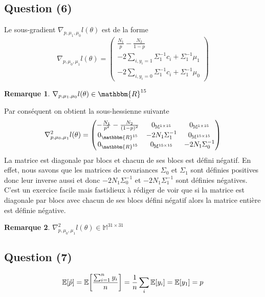 \documentclass[10pt,a4paper]{report}\usepackage[]{graphicx}\usepackage[]{color}
\newtheorem*{rmq}{Remarque}
\begin{document}
\subsection{Question (6)}

\noindent Le sous-gradient $\nabla_{p,\mu_1,\mu_0}l(\theta)$ est de la forme 
$$
\nabla_{p,\mu_0,\mu_1}l(\theta) = 
\begin{pmatrix} 
\frac{N_1}{p} - \frac{N_2}{1-p} \\
-2\sum_{i,y_i = 1}\Sigma_1^{-1} c_i + \Sigma_1^{-1}\mu_1 \\
-2\sum_{i,y_i = 0}\Sigma_1^{-1} c_i + \Sigma_1^{-1}\mu_0
\end{pmatrix}
$$

\begin{rmq}
\(\nabla_{p,\mu_1,\mu_0}l(\theta) \in \mathbbm{R}^{15}\)
\end{rmq}

Par cons\'equent on obtient la sous-hessienne suivante
$$
\nabla_{p,\mu_0,\mu_1}^2l(\theta) = 
\begin{pmatrix} 
-\frac{N_1}{p^2} - \frac{N_2}{(1-p)^2} & 0_{\mathbb{M}^{1 \times 15}} & 0_{\mathbb{M}^{1 \times 15}} \\
0_{\mathbbm{R}^{15}} & -2 N_1\Sigma_1^{-1}& 0_{\mathbb{M}^{15 \times 15}} \\
0_{\mathbbm{R}^{15}} & 0_{\mathbb{M}^{15 \times 15}} & -2 N_1\Sigma_0^{-1}
\end{pmatrix}
$$
La matrice est diagonale par blocs et chacun de ses blocs est défini négatif. En effet, nous savons que les matrices de covariances $\Sigma_0$ et $\Sigma_1$ sont définies positives donc leur inverse aussi et donc $-2 N_1\Sigma_0^{-1}$ et $-2 N_1\Sigma_1^{-1}$ sont définies négatives. C'est un exercice facile mais fastidieux à rédiger de voir que si la matrice est diagonale par blocs avec chacun de ses blocs défini négatif alors la matrice entière est définie négative.

\begin{rmq}
\(\nabla_{p,\mu_0,\mu_1}^2l(\theta) \in \mathbb{M}^{31 \times 31}\)
\end{rmq}

\subsection{Question (7)}
$$
\mathbb{E}[\hat p]= \mathbb{E}\bigg{[}\frac{\sum_{i=1}^n y_i}{n}\bigg{]} = \frac{1}{n}\sum_i \mathbb{E}[y_i] = \mathbb{E}[y_1] = p
$$
\end{document}
